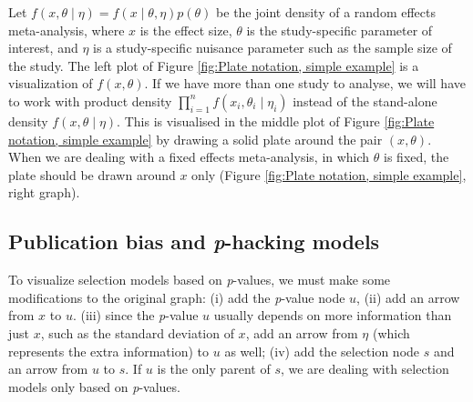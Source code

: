 \documentclass{article}
\theoremstyle{plain}
\theoremstyle{definition}
\begin{document}
Let $f\left(x,\theta\mid\eta\right)=f\left(x\mid\theta,\eta\right)p\left(\theta\right)$
be the joint density of a random effects meta-analysis, where $x$ is the effect size, $\theta$ is the study-specific parameter of interest, and $\eta$ is a study-specific nuisance parameter such as the sample size of the study. The left plot of Figure \ref{fig:Plate notation, simple example} is a visualization of $f\left(x,\theta\right)$. If we have more than one study to analyse, we will have to work with product density $\prod_{i=1}^{n}f\left(x_{i},\theta_{i}\mid\eta_{i}\right)$ instead of the stand-alone density $f\left(x,\theta\mid\eta\right)$. This is visualised in the middle plot of Figure \ref{fig:Plate notation, simple example}  by drawing a solid plate around the pair $\left(x,\theta\right)$. When we are dealing with a fixed effects meta-analysis, in which $\theta$ is fixed, the plate should be drawn around $x$ only (Figure \ref{fig:Plate notation, simple example}, right graph). 


\subsection{Publication bias and \textit{p}-hacking models\label{subsec:Selection sets, meta analysis}}

To visualize selection models based on \textit{p}-values, we must make some modifications to the original graph: (i) add the \textit{p}-value node $u$, (ii) add an arrow from $x$ to $u$. (iii) since the \textit{p}-value $u$ usually depends on more information than just $x$, such as the standard deviation of $x$, add an arrow from $\eta$ (which represents the extra information) to $u$ as well; (iv) add the selection node $s$ and an arrow from $u$ to $s$. If $u$ is the only parent of $s$, we are dealing with selection models only based on
\textit{p}-values. 
\end{document}
